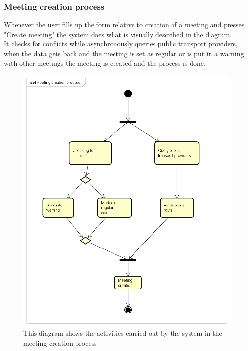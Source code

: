 
\subsubsection{Meeting creation process}
Whenever the user fills up the form relative to creation of a meeting and presses "Create meeting" the system does what is visually described in the diagram.
\\It checks for conflicts while asynchronously queries public transport providers, when the data gets back and the meeting is set as regular or is put in a warning with other meetings the meeting is created and the process is done.

\begin{figure}[htp] 

\includegraphics[width=\textwidth]{activitydiagrams/meetingcreationprocess} 
\caption{This diagram shows the activities carried out by the system in the meeting creation process} 
\label{fig:meetingcreationprocess} 
\end{figure} 
